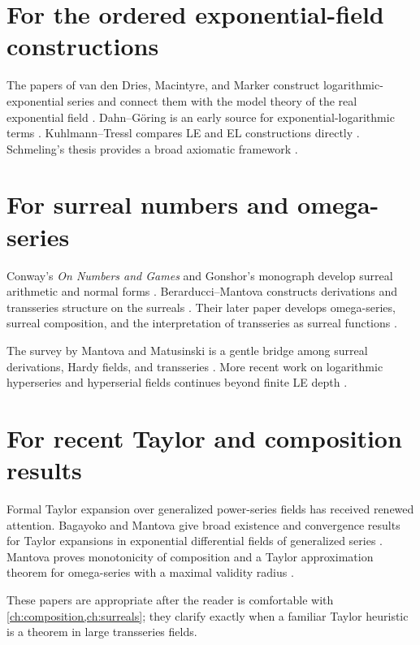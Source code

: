 \documentclass[11pt,openany]{book}
\theoremstyle{definition}
\theoremstyle{plain}
\theoremstyle{remark}
\begin{document}
\section{For the ordered exponential-field constructions}

The papers of van den Dries, Macintyre, and Marker construct logarithmic-exponential series and connect them with the model theory of the real exponential field \cite{vdDMM-1997,vdDMM-2001}. Dahn--G\"oring is an early source for exponential-logarithmic terms \cite{dahn-goring}. Kuhlmann--Tressl compares LE and EL constructions directly \cite{kuhlmann-tressl}. Schmeling's thesis provides a broad axiomatic framework \cite{schmeling}.

\section{For surreal numbers and omega-series}

Conway's \emph{On Numbers and Games} and Gonshor's monograph develop surreal arithmetic and normal forms \cite{conway,gonshor}. Berarducci--Mantova constructs derivations and transseries structure on the surreals \cite{berarducci-mantova-derivation}. Their later paper develops omega-series, surreal composition, and the interpretation of transseries as surreal functions \cite{berarducci-mantova-germs}.

The survey by Mantova and Matusinski is a gentle bridge among surreal derivations, Hardy fields, and transseries \cite{mantova-matusinski}. More recent work on logarithmic hyperseries and hyperserial fields continues beyond finite LE depth \cite{log-hyperseries,hyperserial-field,surreal-hyperseries}.

\section{For recent Taylor and composition results}

Formal Taylor expansion over generalized power-series fields has received renewed attention. Bagayoko and Mantova give broad existence and convergence results for Taylor expansions in exponential differential fields of generalized series \cite{bagayoko-mantova-taylor}. Mantova proves monotonicity of composition and a Taylor approximation theorem for omega-series with a maximal validity radius \cite{mantova-monotonicity}.

These papers are appropriate after the reader is comfortable with \cref{ch:composition,ch:surreals}; they clarify exactly when a familiar Taylor heuristic is a theorem in large transseries fields.
\end{document}
